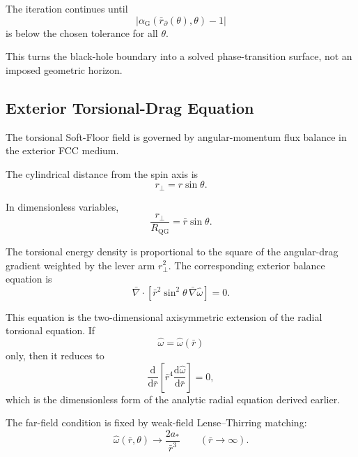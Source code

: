 The iteration continues until
\begin{equation}
    \left| \alpha_{\mathrm{G}}(\bar{r}_{\partial}(\theta),\theta)-1 \right|
\end{equation}
is below the chosen tolerance for all $\theta$.

This turns the black-hole boundary into a solved phase-transition surface, not an imposed geometric horizon.

\subsection{Exterior Torsional-Drag Equation}

The torsional Soft-Floor field is governed by angular-momentum flux balance in the exterior FCC medium.

The cylindrical distance from the spin axis is
\begin{equation}
    r_\perp = r\sin\theta.
\end{equation}

In dimensionless variables,
\begin{equation}
    \frac{r_\perp}{R_{\mathrm{QG}}} = \bar{r}\sin\theta.
\end{equation}

The torsional energy density is proportional to the square of the angular-drag gradient weighted by the lever arm $r_\perp^2$. The corresponding exterior balance equation is
\begin{equation}
    \boxed{ \bar{\nabla}\cdot \left[ \bar{r}^2\sin^2\theta \, \bar{\nabla}\widehat{\omega} \right] = 0. }
\end{equation}

This equation is the two-dimensional axisymmetric extension of the radial torsional equation. If
\begin{equation}
    \widehat{\omega} = \widehat{\omega}(\bar{r})
\end{equation}
only, then it reduces to
\begin{equation}
    \frac{\mathrm{d}}{\mathrm{d}\bar{r}} \left[ \bar{r}^4 \frac{\mathrm{d}\widehat{\omega}}{\mathrm{d}\bar{r}} \right] = 0,
\end{equation}
which is the dimensionless form of the analytic radial equation derived earlier.

The far-field condition is fixed by weak-field Lense--Thirring matching:
\begin{equation}
    \boxed{ \widehat{\omega}(\bar{r},\theta) \rightarrow \frac{2a_\ast}{\bar{r}^3} \qquad (\bar{r}\rightarrow\infty). }
\end{equation}

